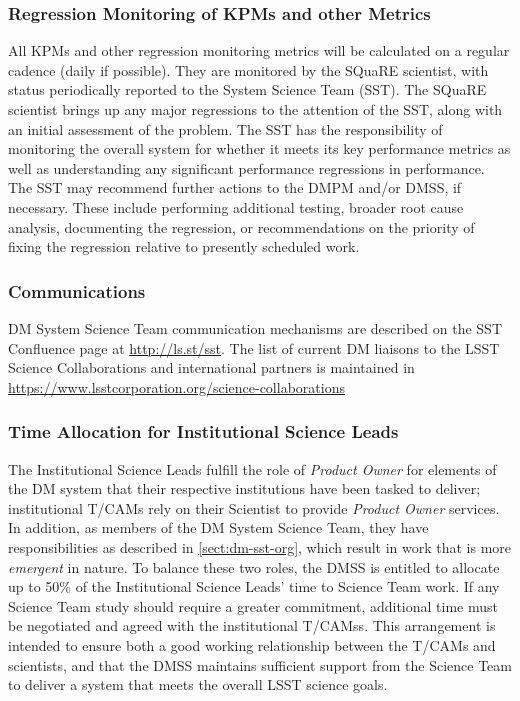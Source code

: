 \subsubsection{Regression Monitoring of KPMs and other Metrics}

All KPMs and other regression monitoring metrics will be calculated on a regular cadence (daily if possible).
They are monitored by the SQuaRE scientist, with status periodically reported to the System Science Team (SST).
The SQuaRE scientist brings up any major regressions to the attention of the SST, along with an initial assessment of the problem.
The SST has the responsibility of monitoring the overall system for whether it meets its key performance metrics as well as understanding any significant performance regressions in performance.
The SST may recommend further actions to the \gls{DMPM} and/or \gls{DMSS}, if necessary.
These include performing additional testing, broader root cause analysis, documenting the regression, or recommendations on the priority of fixing the regression relative to presently scheduled work.

\subsubsection{Communications}

DM System Science Team communication mechanisms are described on the SST Confluence page at \url{http://ls.st/sst}. The list of current  DM liaisons to the LSST Science Collaborations and international partners is maintained  in  \url{https://www.lsstcorporation.org/science-collaborations}

\subsubsection{Time Allocation for Institutional Science Leads}

The Institutional Science Leads fulfill the role of \textit{Product Owner} for elements of the DM system that their respective institutions have been tasked to deliver; institutional T/CAMs rely on their Scientist to provide  \emph{Product Owner}  services.
In addition, as members of the DM System Science Team, they have responsibilities as described in \ref{sect:dm-sst-org}, which result in work that is more \textit{emergent} in nature.
To balance these two roles, the \gls{DMSS} is entitled to allocate up to 50\% of the Institutional Science Leads' time to Science Team work.
If any Science Team study should require a greater commitment, additional time must be negotiated and agreed with the institutional \glspl{T/CAM}s.
This arrangement is intended to ensure both a good working relationship between the T/CAMs and scientists, and that the \gls{DMSS} maintains sufficient support from the Science Team to deliver a system that meets the overall LSST science goals.

